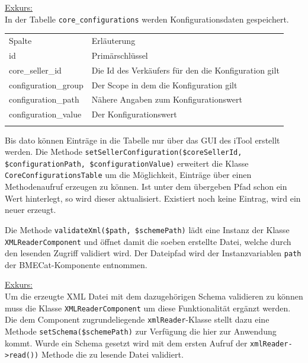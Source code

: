 	\begin{addmargin}[1cm]{1cm}
	\underline{Exkurs:}\\
	 In der Tabelle \texttt{core\_configurations} werden Konfigurationsdaten gespeichert. 	 
	 \begin{table}[!htbp]
	 \begin{addmargin}[1cm]{1cm}
	 \centering
		 		\begin{tabularx}{\linewidth}{p{4cm} X}
		 		\rowcolor[HTML]{EFEFEF} 
		 		Spalte & Erläuterung \\ \cline{1-2} \addlinespace[7pt]
		 		id & Primärschlüssel \\
		 		core\_seller\_id & Die Id des Verkäufers für den die Konfiguration gilt \\
		 		configuration\_group & Der Scope in dem die Konfiguration gilt \\
		 		configuration\_path & Nähere Angaben zum Konfigurationswert \\
		 		configuration\_value & Der Konfigurationswert \\\addlinespace[7pt] \cline{1-2} 
		 		\end{tabularx}%
		 	\end{addmargin}
		 	\end{table}
	 
	 Bis dato können Einträge in die Tabelle nur über das GUI des iTool erstellt werden. Die Methode \texttt{setSellerConfiguration(\$coreSellerId, \$configurationPath, \$configurationValue)} erweitert die Klasse \texttt{CoreConfigurationsTable} um die Möglichkeit, Einträge über einen Methodenaufruf erzeugen zu können. Ist unter dem übergeben Pfad schon ein Wert hinterlegt, so wird dieser aktualisiert. Existiert noch keine Eintrag, wird ein neuer erzeugt.
		\end{addmargin}
	
	Die Methode \texttt{validateXml(\$path, \$schemePath)} lädt eine Instanz der Klasse \texttt{XMLReaderComponent} und öffnet damit die soeben erstellte Datei, welche durch den lesenden Zugriff validiert wird. Der Dateipfad wird der Instanzvariablen \texttt{path} der BMECat-Komponente entnommen.
	
		\begin{addmargin}[1cm]{1cm}
		\underline{Exkurs:}\\
		Um die erzeugte XML Datei mit dem dazugehörigen Schema validieren zu können muss die Klasse \texttt{XMLReaderComponent} um diese Funktionalität ergänzt werden. Die dem Component zugrundeliegende \texttt{xmlReader}-Klasse stellt dazu eine Methode \texttt{setSchema(\$schemePath)} zur Verfügung die hier zur Anwendung kommt. Wurde ein Schema gesetzt wird mit dem ersten Aufruf der \texttt{xmlReader->read())} Methode die zu lesende Datei validiert. 
		\end{addmargin}
	
